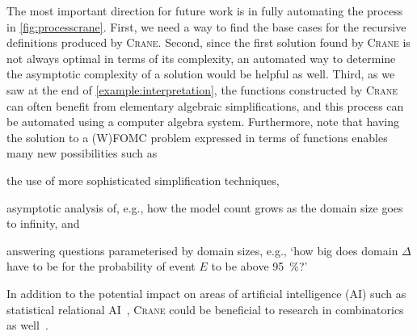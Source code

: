 \documentclass{article}
\begin{document}
The most important direction for future work is in fully automating the process
in \cref{fig:processcrane}. First, we need a way to find the base cases for the
recursive definitions produced by \textsc{Crane}. Second, since the first
solution found by \textsc{Crane} is not always optimal in terms of its
complexity, an automated way to determine the asymptotic complexity of a
solution would be helpful as well. Third, as we saw at the end of
\cref{example:interpretation}, the functions constructed by \textsc{Crane} can
often benefit from elementary algebraic simplifications, and this process can be
automated using a computer algebra system. Furthermore, note that having the
solution to a (W)FOMC problem expressed in terms of functions enables many new
possibilities such as
\begin{enumerate*}[label=(\roman*)]
  \item the use of more sophisticated simplification techniques,
  \item asymptotic analysis of, e.g., how the model count grows as the domain
  size goes to infinity, and
  \item answering questions parameterised by domain sizes, e.g., `how big does
  domain $\Delta$ have to be for the probability of event $E$ to be above
  \SI{95}{\percent}?'
\end{enumerate*}
In addition to the potential impact on areas of artificial intelligence (AI)
such as statistical relational AI~\cite{DBLP:series/synthesis/2016Raedt},
\textsc{Crane} could be beneficial to research in combinatorics as
well~\cite{DBLP:conf/ilp/BarvinekB0ZK21}.



\end{document}
